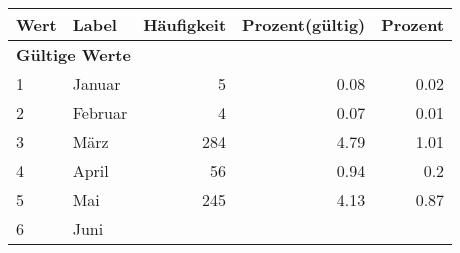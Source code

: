      \begin{longtable}{lXrrr}
     \toprule
     \textbf{Wert} & \textbf{Label} & \textbf{Häufigkeit} & \textbf{Prozent(gültig)} & \textbf{Prozent} \\
     \endhead
     \midrule
     \multicolumn{5}{l}{\textbf{Gültige Werte}}\\

     1 &
     \multicolumn{1}{X}{ Januar   } &


       \num{5} &
       \num[round-mode=places,round-precision=2]{0.08} &
         \num[round-mode=places,round-precision=2]{0.02} \\

     2 &
     \multicolumn{1}{X}{ Februar   } &


       \num{4} &
       \num[round-mode=places,round-precision=2]{0.07} &
         \num[round-mode=places,round-precision=2]{0.01} \\

     3 &
     \multicolumn{1}{X}{ März   } &


       \num{284} &
       \num[round-mode=places,round-precision=2]{4.79} &
         \num[round-mode=places,round-precision=2]{1.01} \\

     4 &
     \multicolumn{1}{X}{ April   } &


       \num{56} &
       \num[round-mode=places,round-precision=2]{0.94} &
         \num[round-mode=places,round-precision=2]{0.2} \\

     5 &
     \multicolumn{1}{X}{ Mai   } &


       \num{245} &
       \num[round-mode=places,round-precision=2]{4.13} &
         \num[round-mode=places,round-precision=2]{0.87} \\

     6 &
     \multicolumn{1}{X}{ Juni   } &



\end{longtable}
